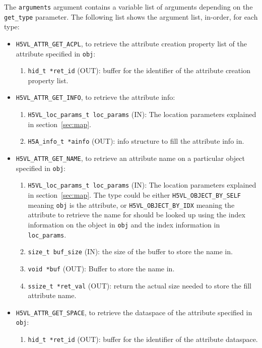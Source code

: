 The {\tt arguments} argument contains a variable list of arguments
depending on the {\tt get\_type} parameter. The following list shows
the argument list, in-order, for each type:

\begin{itemize}

\item {\tt H5VL\_ATTR\_GET\_ACPL}, to retrieve the attribute creation
  property list of the attribute specified in {\tt obj}:
  \begin{enumerate}
  \item {\tt hid\_t *ret\_id} (OUT): buffer for the identifier of the
    attribute creation property list.
  \end{enumerate}

\item {\tt H5VL\_ATTR\_GET\_INFO}, to retrieve the attribute info:
  \begin{enumerate}
  \item {\tt H5VL\_loc\_params\_t loc\_params} (IN): The location parameters
    explained in section~\ref{sec:map}. 
  \item {\tt H5A\_info\_t *ainfo} (OUT): info structure to fill the
    attribute info in.
  \end{enumerate}

\item {\tt H5VL\_ATTR\_GET\_NAME}, to retrieve an attribute name on a
  particular object specified in {\tt obj}:
  \begin{enumerate}
  \item {\tt H5VL\_loc\_params\_t loc\_params} (IN): The location parameters
    explained in section~\ref{sec:map}. The type could be either
    {\tt H5VL\_OBJECT\_BY\_SELF} meaning {\tt obj} is the attribute,
    or {\tt H5VL\_OBJECT\_BY\_IDX} meaning the attribute to retrieve
    the name for should be looked up using the index information on
    the object in {\tt obj} and the index information in {\tt loc\_params}.
  \item {\tt size\_t buf\_size} (IN): the size of the buffer to store
    the name in.
  \item {\tt void *buf} (OUT): Buffer to store the name in.
  \item {\tt ssize\_t *ret\_val} (OUT): return the actual size needed
    to store the fill attribute name.
  \end{enumerate}

\item {\tt H5VL\_ATTR\_GET\_SPACE}, to retrieve the dataspace of the
  attribute specified in {\tt obj}:
  \begin{enumerate}
  \item {\tt hid\_t *ret\_id} (OUT): buffer for the identifier of the
    attribute dataspace.
  \end{enumerate}


\end{itemize}
